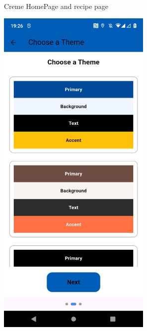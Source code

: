 \documentclass[]{project_interim}
\begin{document}
\begin{figure}[ht!]
\begin{minipage}[t]{0.4\textwidth}
  \end{minipage}
  \caption{Creme HomePage and recipe page}
  \label{fig:1}
\end{figure}

\begin{figure}[ht!]
  \centering
  \begin{minipage}[t]{0.4\textwidth}
    \includegraphics[width=20em]{colourPalette.png}
  \end{minipage}
  \hfill
  \begin{minipage}[t]{0.4\textwidth}

\end{minipage}
\end{figure}
\end{document}
